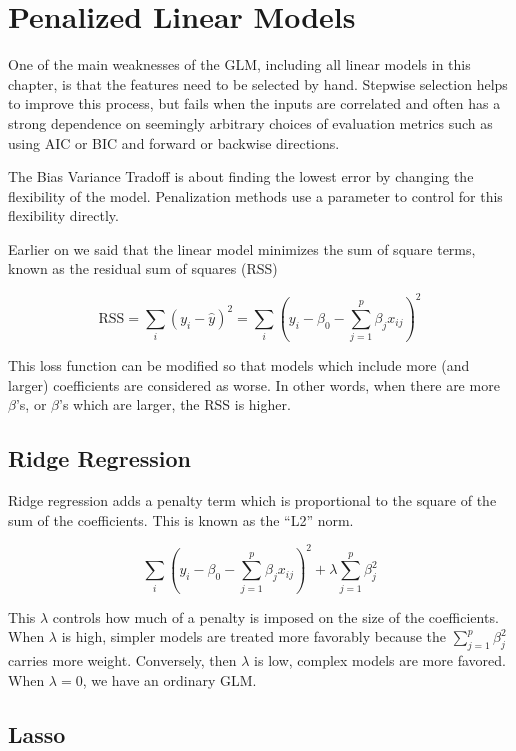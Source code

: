 \documentclass[]{book}
\begin{document}
\hypertarget{penalized-linear-models}{%
\chapter{Penalized Linear Models}\label{penalized-linear-models}}

One of the main weaknesses of the GLM, including all linear models in this chapter, is that the features need to be selected by hand. Stepwise selection helps to improve this process, but fails when the inputs are correlated and often has a strong dependence on seemingly arbitrary choices of evaluation metrics such as using AIC or BIC and forward or backwise directions.

The Bias Variance Tradoff is about finding the lowest error by changing the flexibility of the model. Penalization methods use a parameter to control for this flexibility directly.

Earlier on we said that the linear model minimizes the sum of square terms, known as the residual sum of squares (RSS)

\[
\text{RSS} = \sum_i(y_i - \hat{y})^2 = \sum_i(y_i - \beta_0 - \sum_{j = 1}^p\beta_j x_{ij})^2
\]

This loss function can be modified so that models which include more (and larger) coefficients are considered as worse. In other words, when there are more \(\beta\)'s, or \(\beta\)'s which are larger, the RSS is higher.

\hypertarget{ridge-regression}{%
\section{Ridge Regression}\label{ridge-regression}}

Ridge regression adds a penalty term which is proportional to the square of the sum of the coefficients. This is known as the ``L2'' norm.

\[
\sum_i(y_i - \beta_0 - \sum_{j = 1}^p\beta_j x_{ij})^2 + \lambda \sum_{j = 1}^p\beta_j^2
\]

This \(\lambda\) controls how much of a penalty is imposed on the size of the coefficients. When \(\lambda\) is high, simpler models are treated more favorably because the \(\sum_{j = 1}^p\beta_j^2\) carries more weight. Conversely, then \(\lambda\) is low, complex models are more favored. When \(\lambda = 0\), we have an ordinary GLM.

\hypertarget{lasso}{%
\section{Lasso}\label{lasso}}
\end{document}
